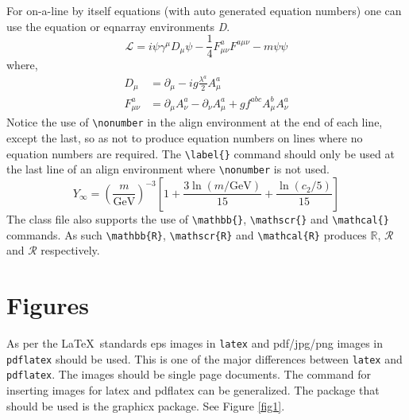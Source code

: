 \documentclass{CUP-JNL-DCE}
\begin{document}
For on-a-line by itself equations (with auto generated equation numbers)
one can use the equation or eqnarray environments \textit{D}.
\begin{equation}
\mathcal{L} = i {\psi} \gamma^\mu D_\mu \psi
    - \frac{1}{4} F_{\mu\nu}^a F^{a\mu\nu} - m {\psi} \psi
\label{eq1}
\end{equation}
where,
\begin{align}
D_\mu &=  \partial_\mu - ig \frac{\lambda^a}{2} A^a_\mu
\nonumber \\
F^a_{\mu\nu} &= \partial_\mu A^a_\nu - \partial_\nu A^a_\mu
    + g f^{abc} A^b_\mu A^a_\nu
\label{eq2}
\end{align}
Notice the use of \verb+\nonumber+ in the align environment at the end
of each line, except the last, so as not to produce equation numbers on
lines where no equation numbers are required. The \verb+\label{}+ command
should only be used at the last line of an align environment where
\verb+\nonumber+ is not used.
\begin{equation}
Y_\infty = \left( \frac{m}{\textrm{GeV}} \right)^{-3}
    \left[ 1 + \frac{3 \ln(m/\textrm{GeV})}{15}
    + \frac{\ln(c_2/5)}{15} \right]
\end{equation}
The class file also supports the use of \verb+\mathbb{}+, \verb+\mathscr{}+ and
\verb+\mathcal{}+ commands. As such \verb+\mathbb{R}+, \verb+\mathscr{R}+
and \verb+\mathcal{R}+ produces $\mathbb{R}$, $\mathscr{R}$ and $\mathcal{R}$
respectively.


\section{Figures}

As per the \LaTeX\ standards eps images in \verb!latex! and pdf/jpg/png images in
\verb!pdflatex! should be used. This is one of the major differences between \verb!latex!
and \verb!pdflatex!. The images should be single page documents. The command for inserting images
for latex and pdflatex can be generalized. The package that should be used
is the graphicx package. See Figure \ref{fig1}.
\end{document}
